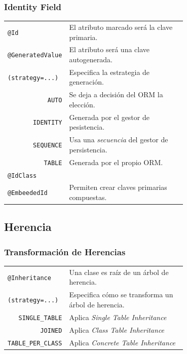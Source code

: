 \documentclass[a4paper,slidestop,xcolor=pst,blue]{beamer}
\newcommand{\ann}[1]{\color{blue}\texttt{#1}\color{black}}
\begin{document}
\begin{frame}[c]
    \frametitle{Identity Field}
    \begin{tabular}{lp{0.70\linewidth}}
        \ann{@Id} & El atributo marcado será la clave primaria. \\
        \ann{@GeneratedValue} & El atributo será una clave autogenerada. \\
        \multicolumn{1}{l}{\ann{(strategy=...)}} & Especifica la estrategia de generación. \\
        \multicolumn{1}{r}{\texttt{AUTO}}     & Se deja a decisión del ORM la elección. \\
        \multicolumn{1}{r}{\texttt{IDENTITY}} & Generada por el gestor de pesistencia. \\
        \multicolumn{1}{r}{\texttt{SEQUENCE}} & Usa una \emph{secuencia} del gestor de persistencia. \\
        \multicolumn{1}{r}{\texttt{TABLE}}    & Generada por el propio ORM. \\
        \ann{@IdClass}    & \\
        \ann{@EmbeededId} & Permiten crear claves primarias compuestas.\\
    \end{tabular}
\end{frame}

\subsection{Herencia}

\begin{frame}[c]
    \frametitle{Transformación de Herencias}
    \begin{tabular}{lp{0.70\linewidth}}
        \ann{@Inheritance}                       &  Una clase es raíz de un árbol de herencia.          \\
        \multicolumn{1}{l}{\ann{(strategy=...)}} & Especifica cómo se transforma un árbol de herencia.  \\
        \multicolumn{1}{r}{\texttt{SINGLE\_TABLE}}    & Aplica \emph{Single Table Inheritance}    \\
        \multicolumn{1}{r}{\texttt{JOINED}}          & Aplica \emph{Class Table Inheritance}     \\
        \multicolumn{1}{r}{\texttt{TABLE\_PER\_CLASS}} & Aplica \emph{Concrete Table Inheritance}  \\
    \end{tabular}
\end{frame}
\end{document}
